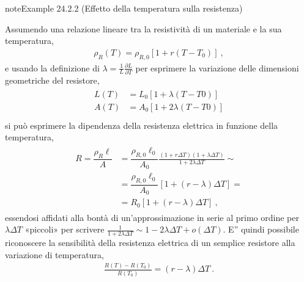 \documentclass[letterpaper,10pt,italian]{jupyterBook}
\begin{document}
\begin{sphinxadmonition}{note}{Example 24.2.2 (Effetto della temperatura sulla resistenza)}



\sphinxAtStartPar
Assumendo una relazione lineare tra la resistività di un materiale e la sua temperatura,
\begin{equation*}
\begin{split}\rho_R(T) = \rho_{R,0} \left[ 1 + r (T - T_0) \right] \ ,\end{split}
\end{equation*}
\sphinxAtStartPar
e usando la definizione di {\hyperref[\detokenize{ch/thermodynamics/elastic-solid-1d:physics-hs-thermodynamics-matter-elastic-1d-dilation}]{}} \(\lambda = \frac{1}{L}\frac{\partial L}{\partial T}\) per esprimere la variazione delle dimensioni geometriche del resistore,
\begin{equation*}
\begin{split}\begin{aligned}
  L(T) & = L_0 \left[ 1 + \lambda   (T-T0) \right] \\
  A(T) & = A_0 \left[ 1 + 2 \lambda (T-T0) \right] \\
\end{aligned}\end{split}
\end{equation*}
\sphinxAtStartPar
si può esprimere la dipendenza della resistenza elettrica in funzione della temperatura,
\begin{equation*}
\begin{split}\begin{aligned}
 R = \dfrac{\rho_R \ell}{A} 
 & = \dfrac{\rho_{R,0} \ell_0}{A_0} \frac{\left( 1 + r \Delta T\right)\left( 1 + \lambda \Delta T \right)}{1 + 2 \lambda \Delta T} \sim \\
 & = \dfrac{\rho_{R,0} \ell_0}{A_0} \left[ 1 + \left( r - \lambda \right) \Delta T \right] = \\
 & = R_0 \left[ 1 + \left( r - \lambda \right) \Delta T \right] \ ,
\end{aligned}\end{split}
\end{equation*}
\sphinxAtStartPar
essendosi affidati alla bontà di un’approssimazione in serie al primo ordine per \(\lambda \Delta T\) «piccoli» per scrivere \(\frac{1}{1 + 2 \lambda \Delta T} \sim 1 - 2 \lambda \Delta T + o(\Delta T)\). E” quindi possibile riconoscere la sensibilità della resistenza elettrica di un semplice resistore alla variazione di temperatura,
\begin{equation*}
\begin{split}\frac{R(T)- R(T_0)}{R(T_0)} = (r - \lambda) \Delta T \ .\end{split}
\end{equation*}\end{sphinxadmonition}
\end{document}
